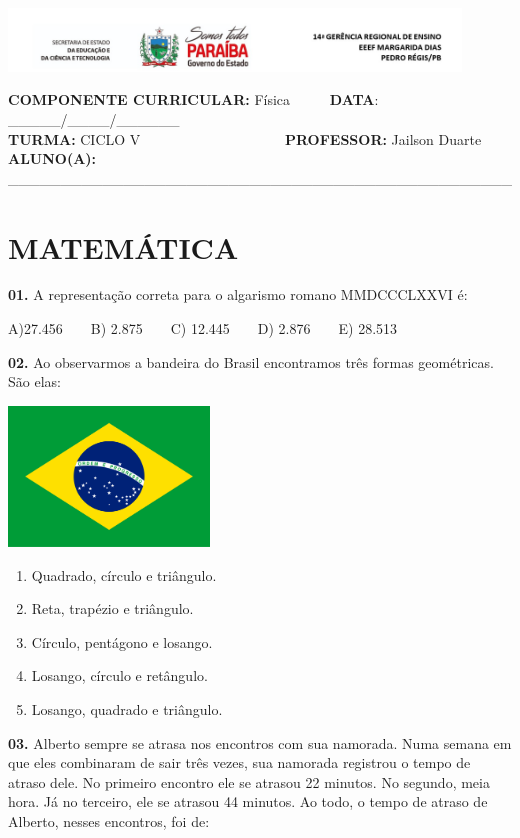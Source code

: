 \documentclass[
  12pt,
]{article}
\author{}
\date{\vspace{-2.5em}}
\begin{document}
\includegraphics[width=0.9\textwidth,height=\textheight]{imagens///logoMD.jpg}

\textbf{COMPONENTE CURRICULAR:} Física ~ ~ ~ \textbf{DATA}:
\_\_\_\_\_/\_\_\_\_/\_\_\_\_\_\_\\
\textbf{TURMA:} CICLO V ~ ~ ~ ~ ~ ~ ~ ~ ~ ~ ~ ~ \textbf{PROFESSOR:}
Jailson Duarte\\
\textbf{ALUNO(A):}
\_\_\_\_\_\_\_\_\_\_\_\_\_\_\_\_\_\_\_\_\_\_\_\_\_\_\_\_\_\_\_\_\_\_\_\_\_\_\_\_\_\_\_\_\_\_\_\_

\hypertarget{matemuxe1tica}{%
\section{\texorpdfstring{\centering MATEMÁTICA}{MATEMÁTICA}}\label{matemuxe1tica}}

\textbf{01.} A representação correta para o algarismo romano MMDCCCLXXVI
é:

A)27.456 ~ ~ B) 2.875 ~ ~ C) 12.445 ~ ~ D) 2.876 ~ ~ E) 28.513
\vspace{1cm}

\textbf{02.} Ao observarmos a bandeira do Brasil encontramos três formas
geométricas. São elas:

\includegraphics[width=0.4\textwidth,height=\textheight]{imagens///banderiraBrasil.jpg}

\begin{enumerate}
\def\labelenumi{\Alph{enumi})}
\item
  Quadrado, círculo e triângulo.
\item
  Reta, trapézio e triângulo.
\item
  Círculo, pentágono e losango.
\item
  Losango, círculo e retângulo.
\item
  Losango, quadrado e triângulo.
\end{enumerate}

\textbf{03.} Alberto sempre se atrasa nos encontros com sua namorada.
Numa semana em que eles combinaram de sair três vezes, sua namorada
registrou o tempo de atraso dele. No primeiro encontro ele se atrasou 22
minutos. No segundo, meia hora. Já no terceiro, ele se atrasou 44
minutos. Ao todo, o tempo de atraso de Alberto, nesses encontros, foi
de:
\end{document}
